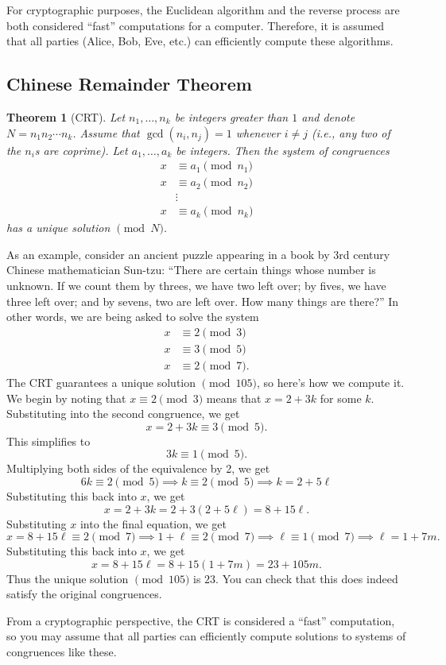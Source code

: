 \documentclass{article}
\newtheorem{theorem}{Theorem}%
\theoremstyle{definition}
\theoremstyle{remark}
\begin{document}
        For cryptographic purposes, the Euclidean algorithm and the reverse process are both considered ``fast'' computations for a computer.
        Therefore, it is assumed that all parties (Alice, Bob, Eve, etc.) can efficiently compute these algorithms.

    \subsection{Chinese Remainder Theorem}

        \begin{theorem}[CRT]
            Let \(n_1,\ldots,n_k\) be integers greater than \(1\) and denote \(N=n_1n_2\cdots n_k\).
            Assume that \(\gcd(n_i,n_j)=1\) whenever \(i\neq j\) (i.e., any two of the \(n_i\)s are coprime).
            Let \(a_1,\ldots,a_k\) be integers.
            Then the system of congruences
            \begin{align*}
                x &\equiv a_1\pmod{n_1}\\
                x &\equiv a_2\pmod{n_2}\\
                &\vdots\\
                x &\equiv a_k\pmod{n_k}
            \end{align*}
            has a unique solution \(\pmod{N}\).
        \end{theorem}

        As an example, consider an ancient puzzle appearing in a book by 3rd century Chinese mathematician Sun-tzu:
        ``There are certain things whose number is unknown. 
        If we count them by threes, we have two left over; by fives, we have three left over; and by sevens, two are left over. 
        How many things are there?''
        In other words, we are being asked to solve the system
        \begin{align*}
            x &\equiv 2\pmod{3}\\
            x &\equiv 3\pmod{5}\\
            x &\equiv 2\pmod{7}.
        \end{align*}
        The CRT guarantees a unique solution \(\pmod{105}\), so here's how we compute it.
        We begin by noting that \(x\equiv 2\pmod 3\) means that \(x=2+3k\) for some \(k\).
        Substituting into the second congruence, we get 
        \[x=2+3k\equiv 3\pmod 5.\]
        This simplifies to
        \[3k\equiv 1\pmod 5.\]
        Multiplying both sides of the equivalence by 2, we get
        \[6k\equiv 2\pmod 5\implies k\equiv 2\pmod 5\implies k=2 + 5\ell\]
        Substituting this back into \(x\), we get 
        \[x = 2 + 3k = 2 + 3(2+5\ell) = 8 + 15\ell.\]
        Substituting \(x\) into the final equation, we get
        \[x = 8+15\ell\equiv 2\pmod 7\implies 1+\ell\equiv 2\pmod 7\implies \ell\equiv 1\pmod 7\implies \ell = 1+7m.\]
        Substituting this back into \(x\), we get
        \[x = 8 + 15\ell = 8 + 15(1+7m) = 23 + 105m.\]
        Thus the unique solution \(\pmod{105}\) is \(23\). 
        You can check that this does indeed satisfy the original congruences.

        From a cryptographic perspective, the CRT is considered a ``fast'' computation, so you may assume that all parties can efficiently compute solutions to systems of congruences like these.
\end{document}
